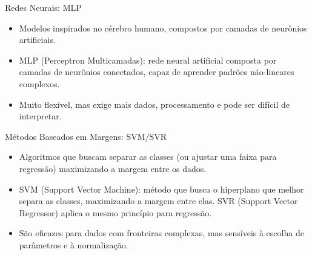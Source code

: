 \documentclass[aspectratio=169]{beamer}
\begin{document}
  \begin{frame}{Redes Neurais: MLP}
    \begin{itemize}
    \item Modelos inspirados no cérebro humano, compostos por camadas de neurônios artificiais.
    \item MLP (Perceptron Multicamadas): rede neural artificial composta por camadas de neurônios conectados, capaz de aprender padrões não-lineares complexos.
    \item Muito flexível, mas exige mais dados, processamento e pode ser difícil de interpretar.
    \end{itemize}
  \end{frame}

  \begin{frame}{Métodos Baseados em Margens: SVM/SVR}
    \begin{itemize}
    \item Algoritmos que buscam separar as classes (ou ajustar uma faixa para regressão) maximizando a margem entre os dados.
    \item SVM (Support Vector Machine): método que busca o hiperplano que melhor separa as classes, maximizando a margem entre elas. SVR (Support Vector Regressor) aplica o mesmo princípio para regressão.
    \item São eficazes para dados com fronteiras complexas, mas sensíveis à escolha de parâmetros e à normalização.
    \end{itemize}
  \end{frame}
\end{document}
